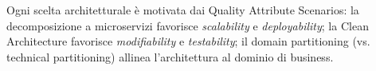 \documentclass[12pt,a4paper]{article}
\begin{document}
Ogni scelta architetturale \`e motivata dai Quality Attribute Scenarios: la decomposizione a microservizi favorisce \textit{scalability} e \textit{deployability}; la Clean Architecture favorisce \textit{modifiability} e \textit{testability}; il domain partitioning (vs. technical partitioning) allinea l'architettura al dominio di business.
\end{document}
